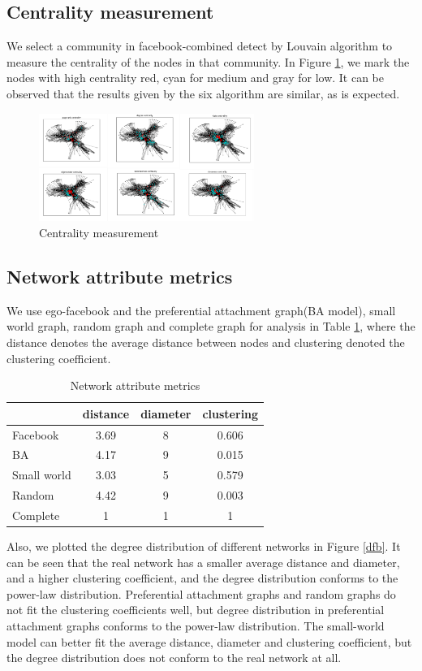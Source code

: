 \documentclass[fleqn,10pt]{SelfArx} %
\begin{document}
	\subsection{Centrality measurement}
	
	We select a community in facebook-combined detect by Louvain algorithm to measure the centrality of the nodes in that community. In Figure \ref{ct}, we mark the nodes with high centrality red, cyan for medium and gray for low. It can be observed that the results given by the six algorithm are similar, as is expected.
	
	\begin{figure}
		\centering
		\includegraphics[width=7cm]{figure/centrality.png}
		\caption{Centrality measurement}
		\label{ct}
	\end{figure}

	\subsection{Network attribute metrics}
	We use ego-facebook and the preferential attachment graph(BA model), small world graph, random graph and complete graph for analysis in Table \ref{qtsx}, where the distance denotes the average distance between nodes and clustering denoted the clustering coefficient.
	
	\begin{table}[]
		\centering
		\begin{tabular}{lccc}
			\hline
			&distance &diameter &clustering \\ \hline
			Facebook  & 3.69& 8  & 0.606      \\
			BA  & 4.17 & 9 & 0.015   \\
			Small world    & 3.03 & 5 & 0.579   \\
			Random       & 4.42 & 9  & 0.003   \\
			Complete    & 1  & 1  & 1             \\ \hline
		\end{tabular}
		\caption{Network attribute metrics}
		\label{qtsx}
	\end{table}
	
	Also, we plotted the degree distribution of different networks in Figure \ref{dfb}. It can be seen that the real network has a smaller average distance and diameter, and a higher clustering coefficient, and the degree distribution conforms to the power-law distribution. Preferential attachment graphs and random graphs do not fit the clustering coefficients well, but degree distribution in preferential attachment graphs conforms to the power-law distribution. The small-world model can better fit the average distance, diameter and clustering coefficient, but the degree distribution does not conform to the real network at all.
	
\end{document}
